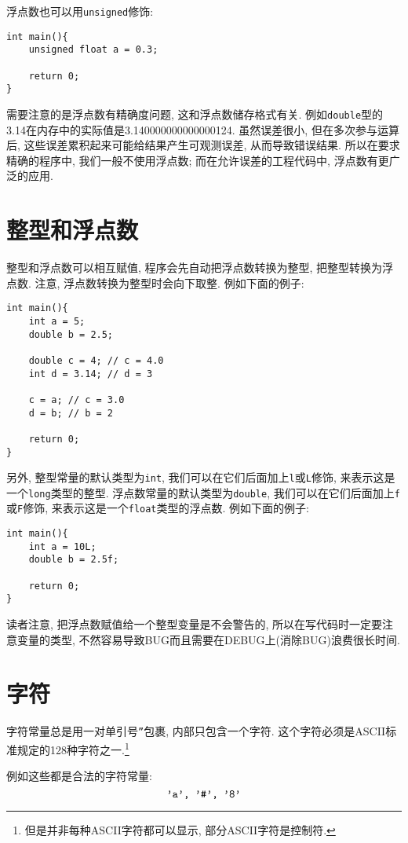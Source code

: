         浮点数也可以用\texttt{unsigned}修饰:
\begin{lstlisting}
int main(){
    unsigned float a = 0.3;

    return 0;
}
\end{lstlisting}

        需要注意的是浮点数有精确度问题, 这和浮点数储存格式有关. 例如\texttt{double}型的3.14在内存中的实际值是3.140000000000000124. 虽然误差很小, 但在多次参与运算后, 这些误差累积起来可能给结果产生可观测误差, 从而导致错误结果. 所以在要求精确的程序中, 我们一般不使用浮点数; 而在允许误差的工程代码中, 浮点数有更广泛的应用.

    \section{整型和浮点数}
        整型和浮点数可以相互赋值, 程序会先自动把浮点数转换为整型, 把整型转换为浮点数. 注意, 浮点数转换为整型时会向下取整. 例如下面的例子:
\begin{lstlisting}
int main(){
    int a = 5;
    double b = 2.5;

    double c = 4; // c = 4.0
    int d = 3.14; // d = 3

    c = a; // c = 3.0
    d = b; // b = 2

    return 0;
}
\end{lstlisting}

        另外, 整型常量的默认类型为\texttt{int}, 我们可以在它们后面加上\texttt{l}或\texttt{L}修饰, 来表示这是一个\texttt{long}类型的整型. 浮点数常量的默认类型为\texttt{double}, 我们可以在它们后面加上\texttt{f}或\texttt{F}修饰, 来表示这是一个\texttt{float}类型的浮点数. 例如下面的例子:
\begin{lstlisting}
int main(){
    int a = 10L;
    double b = 2.5f;

    return 0;
}
\end{lstlisting}
        
        读者注意, 把浮点数赋值给一个整型变量是不会警告的, 所以在写代码时一定要注意变量的类型, 不然容易导致BUG而且需要在DEBUG上(消除BUG)浪费很长时间.

    \section{字符}
        字符常量总是用一对单引号\texttt{''}包裹, 内部只包含一个字符. 这个字符必须是ASCII标准规定的128种字符之一.\footnote{但是并非每种ASCII字符都可以显示, 部分ASCII字符是控制符.}
        
        例如这些都是合法的字符常量:
            \[ \mbox{\texttt{'a', '\#', '8'}} \]
        
